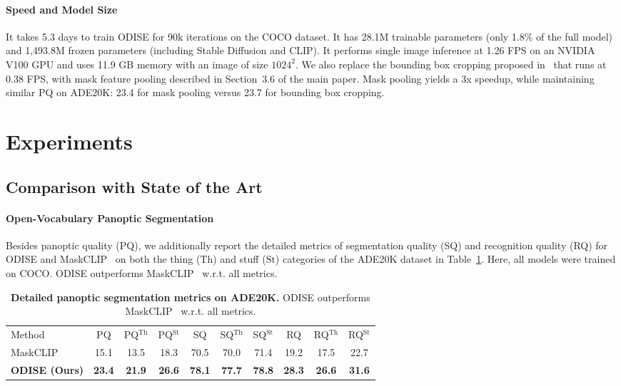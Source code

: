 \documentclass[10pt,twocolumn,letterpaper]{article}
\newcommand{\tablestyle}[2]{\setlength{\tabcolsep}{#1}\renewcommand{\arraystretch}{#2}\centering\small}
\newcommand{\ourmethod}{ODISE}
\begin{document}
\paragraph{Speed and Model Size}
It takes 5.3 days to train \ourmethod{} for 90k iterations on the COCO dataset. It has 28.1M trainable parameters (only 1.8\% of the full model) and 1,493.8M frozen parameters (including Stable Diffusion and CLIP).
It performs single image inference at 1.26 FPS on an NVIDIA V100 GPU and uses 11.9 GB memory with an image of size $1024^2$. We also replace the bounding box cropping proposed in~\cite{gu2021vild} that runs at 0.38 FPS, with mask feature pooling described in Section~3.6 of the main paper. Mask pooling yields a 3x speedup, while maintaining similar PQ on ADE20K: 23.4 for mask pooling versus 23.7 for bounding box cropping.

\section{Experiments}

\subsection{Comparison with State of the Art}
\paragraph{Open-Vocabulary Panoptic Segmentation}

Besides panoptic quality (PQ), we additionally report the detailed metrics of segmentation quality (SQ) and recognition quality (RQ) for \ourmethod{} and MaskCLIP~\cite{ding2022open} on both the thing (${\text{Th}}$) and stuff (${\text{St}}$) categories of the ADE20K dataset in Table~\ref{tab:ade_breakdown}. Here, all models were trained on COCO. \ourmethod{} outperforms MaskCLIP~\cite{ding2022open} w.r.t. all metrics.


\begin{table}[!h]
\tablestyle{1.3pt}{1.1}
\begin{tabular}{l|ccc|ccc|ccc}
   Method                    & PQ   & PQ$^{\text{Th}}$ & PQ$^{\text{St}}$ & SQ   & SQ$^{\text{Th}}$ & SQ$^{\text{St}}$ & RQ   & RQ$^{\text{Th}}$ & RQ$^{\text{St}}$ \\
   \shline
   MaskCLIP                  & 15.1          & 13.5             & 18.3             & 70.5          & 70.0             & 71.4             & 19.2          & 17.5             & 22.7             \\
   \textbf{\ourmethod{} (Ours)} & \textbf{23.4} & \textbf{21.9}    & \textbf{26.6}    & \textbf{78.1} & \textbf{77.7}    & \textbf{78.8}    & \textbf{28.3} & \textbf{26.6}    & \textbf{31.6}   
   \end{tabular}
   \vspace{-.5em}
   \caption{
      \label{tab:ade_breakdown}
      \textbf{Detailed panoptic segmentation metrics on ADE20K.} \ourmethod{} outperforms MaskCLIP~\cite{ding2022open} w.r.t. all metrics.
   }
   \vspace{-1em}
\end{table}
\end{document}

